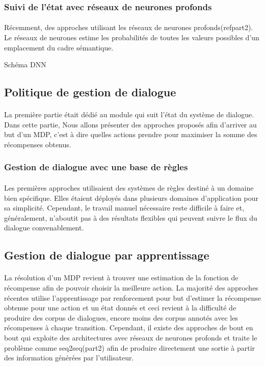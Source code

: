 \subsubsection{Suivi de l’état avec réseaux de neurones profonds}
\paragraph{}
Récemment, des approches utilisant les réseaux de neurones profonds(refpart2). Le réseaux de neurones estime les probabilités de toutes les valeurs possibles d’un emplacement du cadre sémantique\cite{Henderson2013}.


Schéma DNN
	\subsection{Politique de gestion de dialogue}
		\paragraph{}
		La première partie était dédié au module qui suit l’état du système de dialogue. Dans cette partie, Nous allons présenter des approches proposés afin d’arriver au but d’un MDP, c’est à dire quelles actions prendre pour maximiser la somme des récompenses obtenus.
		\subsubsection{Gestion de dialogue avec une base de règles}
		\paragraph{}
		Les premières approches utilisaient des systèmes de règles destiné à un domaine bien spécifique. Elles étaient déployés dans plusieurs domaines d’application pour sa simplicité. Cependant, le travail manuel nécessaire reste difficile à faire et, généralement, n’aboutit pas à des résultats flexibles qui peuvent suivre le flux du dialogue convenablement\cite{Lee2010}.
	\subsection{Gestion de dialogue par apprentissage}
		\paragraph{}
		La résolution d’un MDP revient à trouver une estimation de la fonction de récompense afin de pouvoir choisir la meilleure action. La majorité des approches récentes utilise l’apprentissage par renforcement pour but d’estimer la récompense obtenue pour une action et un état donnés et ceci revient à la difficulté de produire des corpus de dialogues\cite{Henderson2008}, encore moins des corpus annotés avec les récompenses à chaque transition. Cependant, il existe des approches de bout en bout qui exploite des architectures avec réseaux de neurones profonds et traite le problème comme seq2seq(part2) afin de produire directement une sortie à partir des information générées par l’utilisateur\cite{Wen2017}\cite{Serban2016}.


